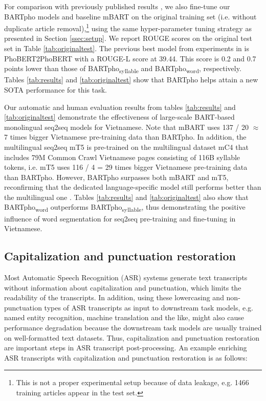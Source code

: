 \documentclass[a4paper]{article}
\begin{document}
For comparison with previously published results \cite{9023886,vietsum}, we also fine-tune our BARTpho models and baseline mBART on the original training set  (i.e. without duplicate article removal),\footnote{This is not a proper experimental setup because of data leakage, e.g. 1466 training articles appear in the test set.} using the same hyper-parameter tuning strategy as presented in Section \ref{ssec:setup}. We report ROUGE scores on the original test set in Table \ref{tab:originaltest}. 
The previous best model from experiments in \cite{9023886,vietsum} is PhoBERT2PhoBERT with a ROUGE-L score at 39.44. This score is 0.2 and 0.7 points lower than those of BARTpho\textsubscript{syllable} and BARTpho\textsubscript{word}, respectively.  
Tables  \ref{tab:results} and \ref{tab:originaltest} show that BARTpho helps attain a new SOTA performance for this task. 

Our automatic and human evaluation results from tables  \ref{tab:results} and \ref{tab:originaltest} demonstrate the effectiveness of large-scale BART-based monolingual seq2seq models for Vietnamese. Note that mBART uses 137 / 20 $\approx$ 7 times bigger Vietnamese pre-training data than BARTpho. In addition, the multilingual seq2seq mT5 \cite{xue-etal-2021-mt5} is pre-trained on the multilingual dataset mC4 that includes 79M Common Crawl Vietnamese pages consisting of 116B syllable tokens, i.e.  mT5 uses 116 / 4 = 29 times bigger Vietnamese pre-training data than BARTpho. However, BARTpho surpasses both mBART and mT5, reconfirming that the dedicated language-specific model still performs better than the multilingual one \cite{nguyen-tuan-nguyen-2020-phobert}. Tables \ref{tab:results} and \ref{tab:originaltest} also show that BARTpho\textsubscript{word} outperforms BARTpho\textsubscript{syllable}, thus demonstrating the positive influence of word segmentation for seq2seq pre-training and fine-tuning in Vietnamese. 





\subsection{Capitalization and punctuation restoration}

Most Automatic Speech Recognition (ASR) systems generate text transcripts without information about capitalization and punctuation, which limits the readability of the transcripts. 
In addition, using these lowercasing and non-punctuation types of ASR transcripts as input to downstream task models, e.g. named entity recognition, machine translation and the like, might also cause performance degradation \cite{tundik18_interspeech} because the downstream task models are usually trained on well-formatted text datasets. Thus, capitalization and punctuation restoration are important steps in ASR transcript post-processing. An example enriching ASR transcripts with capitalization and punctuation restoration is 
as follows: 
\end{document}
